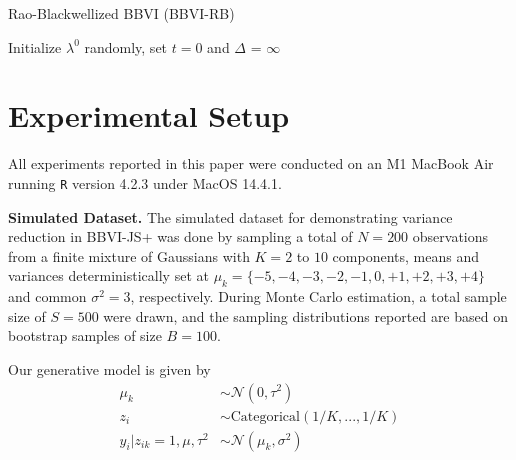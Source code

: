 \documentclass{article}
\begin{document}
\begin{algorithm}[ht]
    \label{alg:bbvi-rb}
    \caption{Rao-Blackwellized BBVI (BBVI-RB) \cite{Ranganath-2014}}

    \DontPrintSemicolon
    \SetAlgoLined
    Initialize $\lambda^0$ randomly, set $t=0$ and $\Delta$ = $\infty$ \;
    \BlankLine
\end{algorithm}

\clearpage

\section{Experimental Setup}
\label{sec:experiments}

All experiments reported in this paper were conducted on an M1 MacBook Air running \texttt{R} version 4.2.3 under MacOS 14.4.1.

\textbf{Simulated Dataset.} The simulated dataset for demonstrating variance reduction in BBVI-JS+ was done by sampling a total of $N = 200$ observations from a finite mixture of Gaussians with $K = 2$ to $10$ components, means and variances deterministically set at $\mu_k = \{-5,-4,-3,-2,-1,0,+1,+2,+3,+4\}$ and common $\sigma^2 = 3$, respectively. During Monte Carlo estimation, a total sample size of $S = 500$ were drawn, and the sampling distributions reported are based on bootstrap samples of size $B = 100$.

Our generative model is given by
\begin{align*}
    \mu_k & \sim \mathcal{N}(0, \tau^2) \\
    z_i  & \sim \text{Categorical}(1/K, ..., 1/K) \\
    y_i | z_{ik} = 1, \mu, \tau^2 & \sim \mathcal{N}(\mu_k, \sigma^2)
\end{align*}
\end{document}
